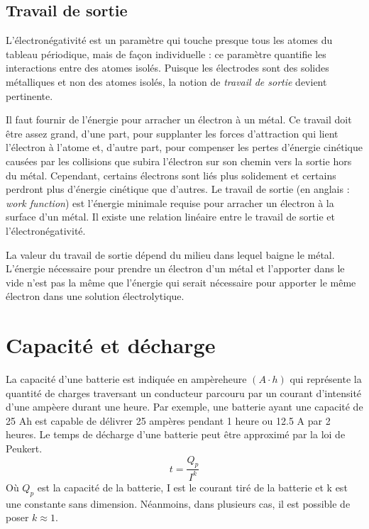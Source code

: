 \documentclass[12pt,oneside,letterpaper]{article}
\begin{document}
\subsection{Travail de sortie}

L'électronégativité est un paramètre qui touche presque tous les atomes du tableau périodique, mais de façon individuelle : ce paramètre quantifie les interactions entre des atomes isolés. Puisque les électrodes sont des solides métalliques et non des atomes isolés, la notion de \textit{travail de sortie} devient pertinente.

Il faut fournir de l'énergie pour arracher un électron à un métal. Ce travail doit être assez grand, d'une part, pour supplanter les forces d'attraction qui lient l'électron à l'atome et, d'autre part, pour compenser les pertes d'énergie cinétique causées par les collisions que subira l'électron sur son chemin vers la sortie hors du métal. Cependant, certains électrons sont liés plus solidement et certains perdront plus d'énergie cinétique que d'autres. Le travail de sortie (en anglais : \textit{work function}) est l'énergie minimale requise pour arracher un électron à la surface d'un métal. %
Il existe une relation linéaire entre le travail de sortie et l'électronégativité. %

La valeur du travail de sortie dépend du milieu dans lequel baigne le métal. L'énergie nécessaire pour prendre un électron d'un métal et l'apporter dans le vide n'est pas la même que l'énergie qui serait nécessaire pour apporter le même électron dans une solution électrolytique.


\section{Capacité et décharge}

La capacité d'une batterie est indiquée en ampèreheure $(A\cdot h)$ qui représente la quantité de charges traversant un conducteur parcouru par un courant d'intensité d'une ampèere durant une heure. Par exemple, une batterie ayant une capacité de 25 Ah est capable de délivrer 25 ampères pendant 1 heure ou 12.5 A par 2 heures. Le temps de décharge d'une batterie peut être approximé par la loi de Peukert.
\begin{equation}
    t=\frac{Q_p}{I^k}
\end{equation}
Où $Q_p$ est la capacité de la batterie, I est le courant tiré de la batterie et k est une constante sans dimension. Néanmoins, dans plusieurs cas, il est possible de poser $k\approx 1$.
\end{document}
